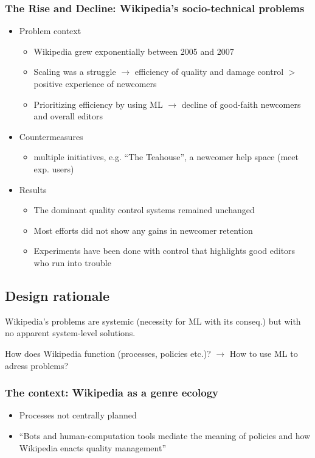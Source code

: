 \documentclass[12pt,a4paper]{article}
\begin{document}
\subsubsection{The Rise and Decline: Wikipedia's socio-technical problems}
\begin{itemize}
\item Problem context
\begin{itemize}
\item Wikipedia grew exponentially between 2005 and 2007
\item Scaling was a struggle \(\rightarrow\) efficiency of quality and damage control \(>\) positive experience of newcomers
\item Prioritizing efficiency by using ML \(\rightarrow\) decline of good-faith newcomers and overall editors
\end{itemize}
\item Countermeasures
\begin{itemize}
\item multiple initiatives, e.g. ``The Teahouse'', a newcomer help space (meet exp. users)
\end{itemize}
\item Results
\begin{itemize}
\item The dominant quality control systems remained unchanged
\item Most efforts did not show any gains in newcomer retention
\item Experiments have been done with control that highlights good editors who run into trouble
\end{itemize}
\end{itemize}
\subsection{Design rationale}
Wikipedia's problems are systemic (necessity for ML with its conseq.) but with no apparent system-level solutions.

How does Wikipedia function (processes, policies etc.)? \(\rightarrow\) How to use ML to adress problems?

\subsubsection{The context: Wikipedia as a genre ecology}
\begin{itemize}
\item Processes not centrally planned
\item ``Bots and human-computation tools mediate the meaning of
policies and how Wikipedia enacts quality management''
\end{itemize}
\end{document}
